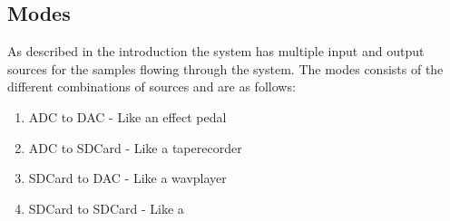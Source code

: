 \subsection{Modes}

As described in the introduction the system has multiple input and output
sources for the samples flowing through the system. The modes consists of the
different combinations of sources and are as follows:

\begin{enumerate}
\item ADC to DAC - Like an effect pedal
\item ADC to SDCard - Like a taperecorder
\item SDCard to DAC - Like a wavplayer
\item SDCard to SDCard - Like a
	\label{enum:data_flow_modes}
\end{enumerate}
